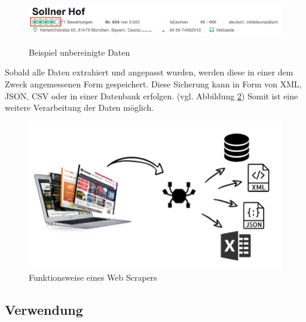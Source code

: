 \documentclass[a4paper,oneside,12pt]{report}
\begin{document}
				\begin{figure}[h]
					\centering
					\begin{minipage}[b]{0.9\textwidth}
						\includegraphics[width=\textwidth]{Bilder/BeispielAnzahlSterne.png}
					\end{minipage}
					\centering
					\caption[Beispiel unbereinigte Daten]{Beispiel unbereinigte Daten} \cite{bib-anzSterne}
					\label{pic-anzSterne}
				\end{figure}
							
				Sobald alle Daten extrahiert und angepasst wurden, werden diese in einer dem Zweck angemessenen Form gespeichert. Diese Sicherung kann in Form von XML, JSON, CSV oder in einer Datenbank erfolgen. (vgl. Abbildung \ref{pic-webscraper2}) Somit ist eine weitere Verarbeitung der Daten möglich. \cite{bib-scrapehero}
				
				\begin{figure}[H]
					\centering
					\begin{minipage}[b]{0.6\textwidth}
						\includegraphics[width=\textwidth]{Bilder/Webcrawler.png}
					\end{minipage}
					\centering
					\caption[Funktionsweise eines Web Scrapers]{Funktionsweise eines Web Scrapers}
					\label{pic-webscraper2}
				\end{figure}
			
			\newpage
			\subsection[Verwendung - Johanna Sickendiek]{Verwendung}
			
\end{document}
